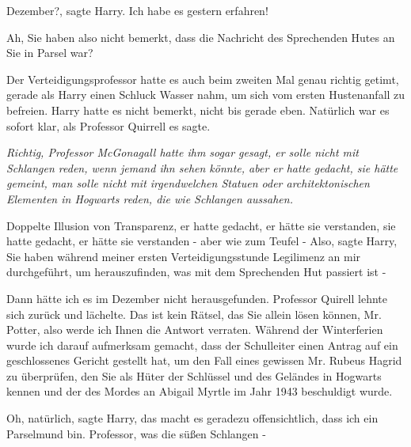 \glqq{}Dezember?\grqq{}, sagte Harry. \glqq{}Ich habe es gestern erfahren!\grqq{}

\glqq{}Ah, Sie haben also nicht bemerkt, dass die Nachricht des Sprechenden Hutes
an Sie in Parsel war?\grqq{}

Der Verteidigungsprofessor hatte es auch beim zweiten Mal genau richtig getimt,
gerade als Harry einen Schluck Wasser nahm, um sich vom ersten Hustenanfall zu
befreien. Harry hatte es nicht bemerkt, nicht bis gerade eben. Natürlich war es
sofort klar, als Professor Quirrell es sagte.

\emph{Richtig, Professor McGonagall hatte ihm sogar gesagt, er solle nicht mit
Schlangen reden, wenn jemand ihn sehen könnte, aber er hatte gedacht, sie hätte
gemeint, man solle nicht mit irgendwelchen Statuen oder architektonischen
Elementen in Hogwarts reden, die wie Schlangen aussahen.}

Doppelte Illusion von Transparenz, er hatte gedacht, er hätte sie verstanden,
sie hatte gedacht, er hätte sie verstanden - aber wie zum Teufel - \glqq{}
Also\grqq{}, sagte Harry, \glqq{}Sie haben während meiner ersten
Verteidigungsstunde Legilimenz an mir durchgeführt, um herauszufinden, was mit
dem Sprechenden Hut passiert ist -\grqq{}

\glqq{}Dann hätte ich es im Dezember nicht herausgefunden.\grqq{} Professor Quirell
lehnte sich zurück und lächelte. \glqq{}Das ist kein Rätsel, das Sie allein lösen
können, Mr. Potter, also werde ich Ihnen die Antwort verraten. Während der
Winterferien wurde ich darauf aufmerksam gemacht, dass der Schulleiter einen
Antrag auf ein geschlossenes Gericht gestellt hat, um den Fall eines gewissen
Mr. Rubeus Hagrid zu überprüfen, den Sie als Hüter der Schlüssel und des
Geländes in Hogwarts kennen und der des Mordes an Abigail Myrtle im Jahr 1943
beschuldigt wurde.\grqq{}

\glqq{}Oh, natürlich\grqq{}, sagte Harry, \glqq{}das macht es geradezu
offensichtlich, dass ich ein Parselmund bin. Professor, was die süßen Schlangen
-\grqq{}

